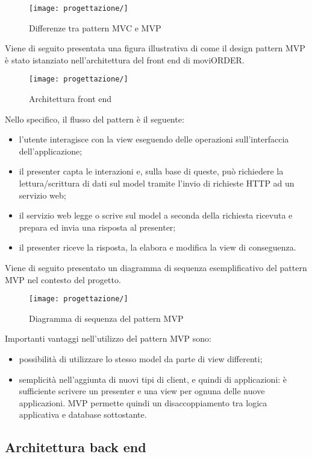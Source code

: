 \begin{figure}[!h] 
    \centering 
    \texttt{[image: progettazione/]} 
    \caption{Differenze tra pattern MVC e MVP}
\end{figure}

Viene di seguito presentata una figura illustrativa di come il design pattern MVP è stato istanziato nell'architettura del front end di moviORDER.

\begin{figure}[!h] 
    \centering 
    \texttt{[image: progettazione/]} 
    \caption{Architettura front end}
\end{figure}

Nello specifico, il flusso del pattern è il seguente:
\begin{itemize}
	\item l'utente interagisce con la view eseguendo delle operazioni sull'interfaccia dell'applicazione;
	\item il presenter capta le interazioni e, sulla base di queste, può richiedere la lettura/scrittura di dati sul model tramite l'invio di richieste HTTP ad un servizio web;
	\item il servizio web legge o scrive sul model a seconda della richiesta ricevuta e prepara ed invia una risposta al presenter;
	\item il presenter riceve la risposta, la elabora e modifica la view di conseguenza.
\end{itemize}
Viene di seguito presentato un diagramma di sequenza esemplificativo del pattern MVP nel contesto del progetto.

\begin{figure}[!h] 
    \centering 
    \texttt{[image: progettazione/]} 
    \caption{Diagramma di sequenza del pattern MVP}
\end{figure}

Importanti vantaggi nell'utilizzo del pattern MVP sono:
\begin{itemize}
	\item possibilità di utilizzare lo stesso model da parte di view differenti;
	\item semplicità nell'aggiunta di nuovi tipi di client, e quindi di applicazioni: è sufficiente scrivere un presenter e una view per ognuna delle nuove applicazioni. MVP permette quindi un disaccoppiamento tra logica applicativa e database sottostante.
\end{itemize}

\subsection{Architettura back end}

